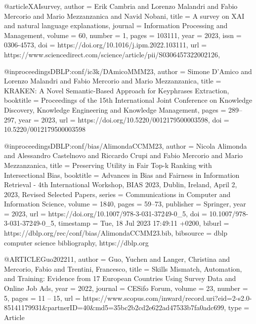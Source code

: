 {@article{XAIsurvey,
author = {Erik Cambria and Lorenzo Malandri and Fabio Mercorio and Mario Mezzanzanica and Navid Nobani},
title = {A survey on XAI and natural language explanations},
journal = {Information Processing and Management},
volume = {60},
number = {1},
pages = {103111},
year = {2023},
issn = {0306-4573},
doi = {https://doi.org/10.1016/j.ipm.2022.103111},
url = {https://www.sciencedirect.com/science/article/pii/S0306457322002126},
}

@inproceedings{DBLP:conf/ic3k/DAmicoMMM23,
  author       = {Simone D'Amico and
                  Lorenzo Malandri and
                  Fabio Mercorio and
                  Mario Mezzanzanica},
  title        = {KRAKEN: A Novel Semantic-Based Approach for Keyphrases Extraction},
  booktitle    = {Proceedings of the 15th International Joint Conference on Knowledge
                  Discovery, Knowledge Engineering and Knowledge Management},
  pages        = {289--297},
  year         = {2023},
  url          = {https://doi.org/10.5220/0012179500003598},
  doi          = {10.5220/0012179500003598}
}

@inproceedings{DBLP:conf/bias/AlimondaCCMM23,
  author       = {Nicola Alimonda and
                  Alessandro Castelnovo and
                  Riccardo Crupi and
                  Fabio Mercorio and
                  Mario Mezzanzanica},
  title        = {Preserving Utility in Fair Top-k Ranking with Intersectional Bias},
  booktitle    = {Advances in Bias and Fairness in Information Retrieval - 4th International
                  Workshop, {BIAS} 2023, Dublin, Ireland, April 2, 2023, Revised Selected
                  Papers},
  series       = {Communications in Computer and Information Science},
  volume       = {1840},
  pages        = {59--73},
  publisher    = {Springer},
  year         = {2023},
  url          = {https://doi.org/10.1007/978-3-031-37249-0_5},
  doi          = {10.1007/978-3-031-37249-0\_5},
  timestamp    = {Tue, 18 Jul 2023 17:49:11 +0200},
  biburl       = {https://dblp.org/rec/conf/bias/AlimondaCCMM23.bib},
  bibsource    = {dblp computer science bibliography, https://dblp.org}
}

@ARTICLE{Guo202211,
	author = {Guo, Yuchen and Langer, Christina and Mercorio, Fabio and Trentini, Francesco},
	title = {Skills Mismatch, Automation, and Training: Evidence from 17 European Countries Using Survey Data and Online Job Ads},
	year = {2022},
	journal = {CESifo Forum},
	volume = {23},
	number = {5},
	pages = {11 – 15},
	url = {https://www.scopus.com/inward/record.uri?eid=2-s2.0-85141179931&partnerID=40&md5=35bc2b2cd2e622ad47533b7fa0adc699},
	type = {Article}
}

}
